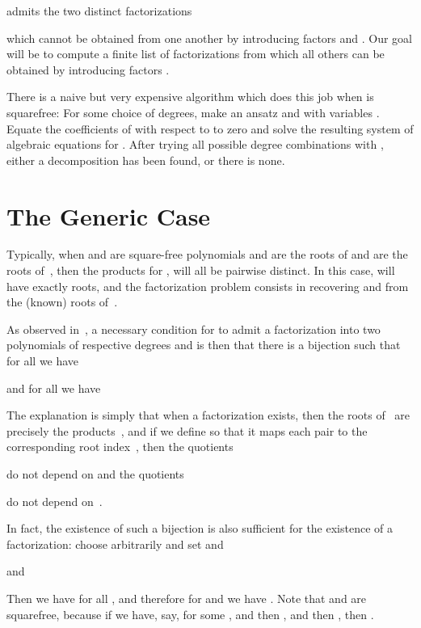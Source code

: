 \documentclass{sig-alternate}
\begin{document}
admits the two distinct factorizations

which cannot be obtained from one another by introducing factors  and
. Our goal will be to compute a finite list of factorizations
from which all others can be obtained by introducing factors
.

There is a naive but very expensive algorithm which does this job when  is
squarefree: For some choice  of degrees, make an ansatz
 and  with variables
.  Equate the coefficients of  with respect to  to zero and
solve the resulting system of algebraic equations for
.  After trying all possible degree
combinations  with , either a decomposition
has been found, or there is none.

\section{The Generic Case}

Typically, when  and  are square-free polynomials and 
are the roots of  and  are the roots of~, then the
products  for ,  will all be pairwise distinct.
In this case,  will have exactly  roots, and the factorization
problem consists in recovering  and 
from the (known) roots  of~.

As observed in~\cite{zeilberger13}, a necessary condition for  to admit a factorization
into two polynomials of respective degrees  and  is then that there is a
bijection  such that for
all  we have

and for all  we have

The explanation is simply that when a factorization exists, then the roots  of~
are precisely the products~, and if we define  so that it
maps each pair  to the corresponding root index~,
then the quotients

do not depend on  and the quotients

do not depend on~.

In fact, the existence of such a bijection  is also sufficient for the
existence of a factorization:
choose  arbitrarily and set  and 

and

Then we have  for all , and therefore 
for  and 
we have .
Note that  and  are squarefree, because if we have, say, 
for some , and then ,
and then , then .
\end{document}
